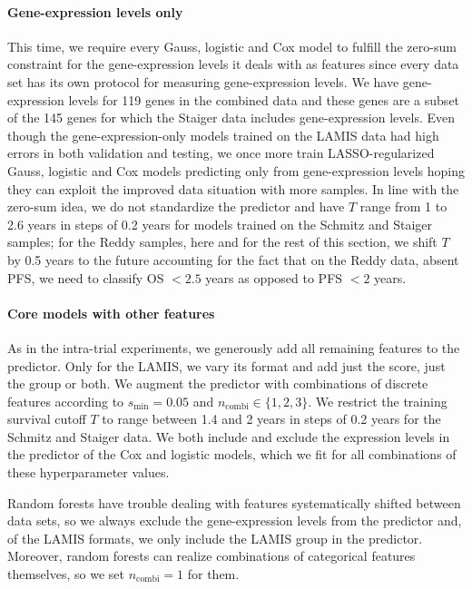 \paragraph{Gene-expression levels only}
This time, we require every Gauss, logistic and Cox model to fulfill the zero-sum constraint for 
the gene-expression levels it deals with as features since every data set has its own protocol for 
measuring gene-expression levels. We have gene-expression levels for \num{119} genes in the 
combined data and these genes are a subset of the \num{145} genes for which the Staiger data 
includes gene-expression levels. Even though the gene-expression-only models trained on the LAMIS 
data had high errors in both validation and testing, we once more train LASSO-regularized Gauss, 
logistic and Cox models predicting only from gene-expression levels hoping they can exploit the 
improved data situation with more samples. In line with the zero-sum idea, we do not standardize 
the predictor and have $T$ range from \num{1} to \num{2.6} years in steps of \num{0.2} years for 
models trained on the Schmitz and Staiger samples; for the Reddy samples, here and for the rest 
of this section, we shift $T$ by
\num{0.5} years to the future accounting for the fact that on the Reddy data, absent PFS, we need 
to classify OS $< \num{2.5}$ years as opposed to PFS $< \num{2}$ years.

\paragraph{Core models with other features}
As in the intra-trial experiments, we generously add all remaining features to the predictor. Only 
for the LAMIS, we vary its format and add just the score, just the group or both. We augment the 
predictor with combinations of discrete features according to $s_\text{min} = \num{0.05}$ and 
$n_\text{combi} \in \{ 1, 2, 3 \}$. We restrict the training survival cutoff $T$ to range between 
\num{1.4} and \num{2} years in steps of \num{0.2} years for the Schmitz and Staiger data. We 
both include and exclude the expression levels in the predictor of the Cox and logistic 
models, which we fit for all combinations of these hyperparameter values.

Random forests have trouble dealing with features systematically shifted between data sets, so 
we always exclude the gene-expression levels from the predictor and, of the LAMIS formats, we only 
include the LAMIS group in the predictor. Moreover, random forests can realize combinations of 
categorical features themselves, so we set $n_\text{combi} = 1$ for them.

